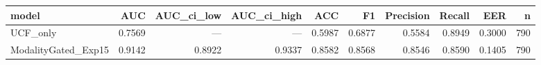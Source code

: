 \begin{tabular}{lrrrrrrrrr}
\toprule
model & AUC & AUC_ci_low & AUC_ci_high & ACC & F1 & Precision & Recall & EER & n \\
\midrule
UCF_only & 0.7569 & — & — & 0.5987 & 0.6877 & 0.5584 & 0.8949 & 0.3000 & 790 \\
ModalityGated_Exp15 & 0.9142 & 0.8922 & 0.9337 & 0.8582 & 0.8568 & 0.8546 & 0.8590 & 0.1405 & 790 \\
\bottomrule
\end{tabular}
